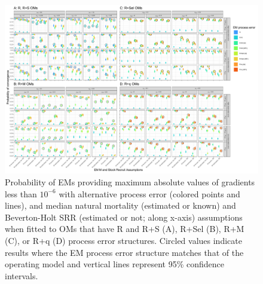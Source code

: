 \documentclass[
  12pt,
]{article}
\begin{document}
\begin{landscape}
\begin{figure}
\begin{center}
\includegraphics[width = 1.4\textwidth]{type_3_convergence_plots}
\end{center}
\caption{Probability of EMs providing maximum absolute values of gradients less than $10^{-6}$ with alternative process error (colored points and lines), and median natural mortality (estimated or known) and Beverton-Holt SRR (estimated or not; along x-axis) assumptions when fitted to OMs that have R and R+S (A), R+Sel (B), R+M (C), or R+q (D) process error structures. Circled values indicate results where the EM process error structure matches that of the operating model and vertical lines represent 95\% confidence intervals.}\label{gradient_convergence}
\end{figure}
\end{landscape}
\end{document}
